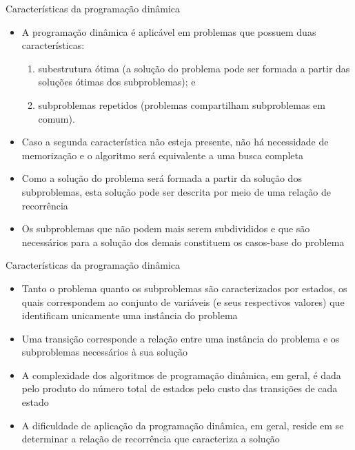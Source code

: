 \begin{frame}[fragile]{Características da programação dinâmica}

    \begin{itemize}
        \item A programação dinâmica é aplicável em problemas que possuem duas características:

        \begin{enumerate}
            \item subestrutura ótima (a solução do problema pode ser formada a partir das soluções
                ótimas dos subproblemas); e
            \item subproblemas repetidos (problemas compartilham subproblemas em comum).
        \end{enumerate}

        \item Caso a segunda característica não esteja presente, não há necessidade de memorização
            e o algoritmo será equivalente a uma busca completa

        \item Como a solução do problema será formada a partir da solução dos subproblemas, esta
            solução pode ser descrita por meio de uma relação de recorrência

        \item Os subproblemas que não podem mais serem subdivididos e que são necessários para
            a solução dos demais constituem os casos-base do problema
    \end{itemize}

\end{frame}

\begin{frame}[fragile]{Características da programação dinâmica}

    \begin{itemize}
        \item Tanto o problema quanto os subproblemas são caracterizados por estados, os quais
            correspondem ao conjunto de variáveis (e seus respectivos valores) que identificam
            unicamente uma instância do problema
        
        \item Uma transição corresponde a relação entre uma instância do problema e os 
            subproblemas necessários à sua solução

        \item A complexidade dos algoritmos de programação dinâmica, em geral, é dada pelo
            produto do número total de estados pelo custo das transições de cada estado

        \item A dificuldade de aplicação da programação dinâmica, em geral, reside em se determinar
            a relação de recorrência que caracteriza a solução
    \end{itemize}

\end{frame}

